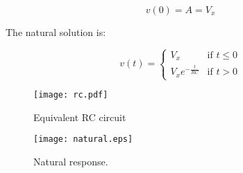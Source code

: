 \begin{equation}
  v(0) = A = V_x
\end{equation}

The natural solution is:

\begin{equation}
  \label{nat_sol} v(t) =
  \begin{cases}
    V_x & \mbox{if } t \leq 0 \\
    V_xe^{-\frac{t}{RC}} & \mbox{if } t > 0
  \end{cases}
\end{equation}

\begin{figure}[H]
  \centering
  \texttt{[image: rc.pdf]}
  \caption{Equivalent RC circuit}
  \label{rc_fig}
\end{figure}

\begin{figure}[H]
  \centering
  \texttt{[image: natural.eps]}
  \caption{Natural response.}
  \label{fig:nat}
\end{figure}
